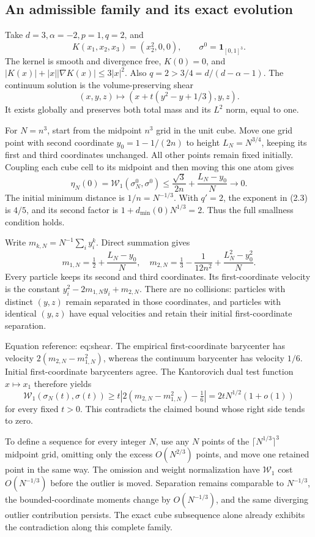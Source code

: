 \documentclass[10pt]{article}
\begin{document}
\subsection*{An admissible family and its exact evolution}
Take \(d=3,\alpha=-2,p=1,q=2\), and \[K(x_1,x_2,x_3)=(x_2^2,0,0),\qquad
 \sigma^0=\mathbf 1_{[0,1]^3}.\] The kernel is smooth and divergence free, \(K(0)=0\), and \(|K(x)|+|x||\nabla K(x)|\le3|x|^2\). Also \(q=2>3/4=d/(d-\alpha-1)\). The continuum solution is the volume-preserving shear \[(x,y,z)\longmapsto (x+t(y^2-y+1/3),y,z).\] It exists globally and preserves both total mass and its \(L^2\) norm, equal to one.\par
For \(N=n^3\), start from the midpoint \(n^3\) grid in the unit cube. Move one grid point with second coordinate \(y_0=1-1/(2n)\) to height \(L_N=N^{3/4}\), keeping its first and third coordinates unchanged. All other points remain fixed initially. Coupling each cube cell to its midpoint and then moving this one atom gives \[\eta_N(0)=\mathcal W_1(\sigma_N^0,\sigma^0)
 \le \frac{\sqrt3}{2n}+\frac{L_N-y_0}{N}\longrightarrow0 .\] The initial minimum distance is \(1/n=N^{-1/3}\). With \(q'=2\), the exponent in (2.3) is \(4/5\), and its second factor is \(1+d_{\min}(0)N^{1/3}=2\). Thus the full smallness condition holds.\par
Write \(m_{k,N}=N^{-1}\sum_i y_i^k\). Direct summation gives \[m_{1,N}=\tfrac12+\frac{L_N-y_0}{N},\quad
 m_{2,N}=\tfrac13-\frac1{12n^2}+\frac{L_N^2-y_0^2}{N}.\] Every particle keeps its second and third coordinates. Its first-coordinate velocity is the constant \(y_i^2-2m_{1,N}y_i+m_{2,N}\). There are no collisions: particles with distinct \((y,z)\) remain separated in those coordinates, and particles with identical \((y,z)\) have equal velocities and retain their initial first-coordinate separation.\par
Equation reference: eq:shear. The empirical first-coordinate barycenter has velocity \(2(m_{2,N}-m_{1,N}^2)\), whereas the continuum barycenter has velocity \(1/6\). Initial first-coordinate barycenters agree. The Kantorovich dual test function \(x\mapsto x_1\) therefore yields \[
 \mathcal W_1(\sigma_N(t),\sigma(t))
 \ge t\left|2(m_{2,N}-m_{1,N}^2)-\tfrac16\right|
 =2tN^{1/2}(1+o(1))\] for every fixed \(t>0\). This contradicts the claimed bound whose right side tends to zero.\par
To define a sequence for every integer \(N\), use any \(N\) points of the \(\lceil N^{1/3}\rceil^3\) midpoint grid, omitting only the excess \(O(N^{2/3})\) points, and move one retained point in the same way. The omission and weight normalization have \(\mathcal W_1\) cost \(O(N^{-1/3})\) before the outlier is moved. Separation remains comparable to \(N^{-1/3}\), the bounded-coordinate moments change by \(O(N^{-1/3})\), and the same diverging outlier contribution persists. The exact cube subsequence alone already exhibits the contradiction along this complete family.\par
\end{document}

